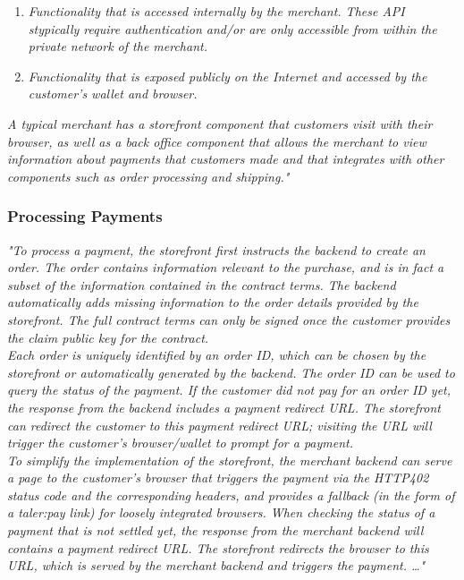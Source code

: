 \begin{enumerate}
    \item \textit{Functionality that is accessed internally by the merchant. 
    These API stypically require authentication and/or are only accessible from within the private network of the merchant.}
    \item \textit{Functionality that is exposed publicly on the Internet and accessed by the customer’s wallet and browser.}
\end{enumerate}

\begin{center}
    \textit{
        A typical merchant has a storefront component that customers visit with their browser, as well as a back office component that allows the merchant to view information about payments that customers made and that integrates with other components such as order processing and shipping."
    }
\end{center}

\subsubsection{Processing Payments}
\begin{center}
    \textit{
        "To process a payment, the storefront first instructs the backend to create an order.
        The order contains information relevant to the purchase, and is in fact a subset of the information contained in the contract terms. 
        The backend automatically adds missing information to the order details provided by the storefront. 
        The full contract terms can only be signed once the customer provides the claim public key for the contract.\\
        Each order is uniquely identified by an order ID, which can be chosen by the storefront or automatically generated by the backend.
        The order ID can be used to query the status of the payment. 
        If the customer did not pay for an order ID yet, the response from the backend includes a payment redirect URL.
        The storefront can redirect the customer to this payment redirect URL; visiting the URL will trigger the customer’s browser/wallet to prompt for a payment.\\
        To simplify the implementation of the storefront, the merchant backend can serve a page to the customer’s browser that triggers the payment via the HTTP402 status code and the corresponding headers, and provides a fallback (in the form of a taler:pay link) for loosely integrated browsers. 
        When checking the status of a payment that is not settled yet, the response from the merchant backend will contains a payment redirect URL. 
        The storefront redirects the browser to this URL, which is served by the merchant backend and triggers the payment.
        \dots "
    }
\end{center}

